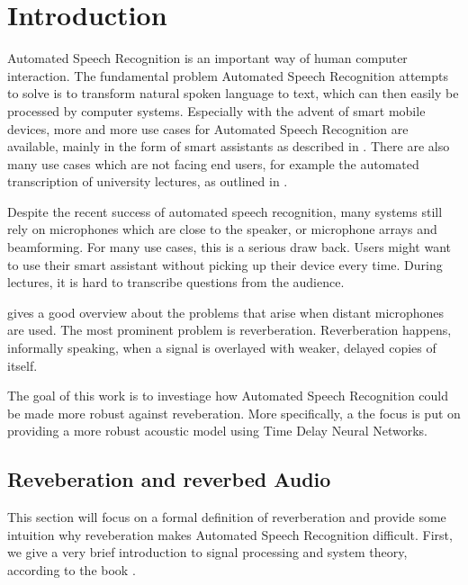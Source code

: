 
\chapter{Introduction}
\label{ch:Introduction}

Automated Speech Recognition is an important way of human computer interaction. The fundamental problem Automated Speech Recognition attempts to solve is to transform natural spoken language to text, which can then easily be processed by computer systems. Especially with the advent of smart mobile devices, more and more use cases for Automated Speech Recognition are available, mainly in the form of smart assistants as described in \cite{lopez2017alexa}. There are also many use cases which are not facing end users, for example the automated transcription of university lectures, as outlined in \cite{muller2016lecture}.

Despite the recent success of automated speech recognition, many systems still rely on microphones which are close to the speaker, or microphone arrays and beamforming. For many use cases, this is a serious draw back. Users might want to use their smart assistant without picking up their device every time. During lectures, it is hard to transcribe questions from the audience. 

\cite{yoshioka2012making} gives a good overview about the problems that arise when distant microphones are used. The most prominent problem is reverberation. Reverberation happens, informally speaking, when a signal is overlayed with weaker, delayed copies of itself. 

The goal of this work is to investiage how Automated Speech Recognition could be made more robust against reveberation. More specifically, a the focus is put on providing a more robust acoustic model using Time Delay Neural Networks. 

\section{Reveberation and reverbed Audio}

This section will focus on a formal definition of reverberation and provide some intuition why reveberation makes Automated Speech Recognition difficult. First, we give a very brief introduction to signal processing and system theory, according to the book \cite{leon2015signale}.

